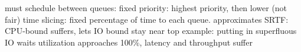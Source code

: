 \documentclass[12pt]{article}
\begin{document}
\begin{spacing}{0.6}
\begin{multicols*}{2}
\begin{flushleft}
\begin{outline}[longenum]
    \2 must schedule between queues:
      \3 fixed priority: highest priority, then lower (not fair)
      \3 time slicing: fixed percentage of time to each queue.
    \2 approximates SRTF: CPU-bound suffers, lets IO bound stay near top
    \2 example: putting in superfluous IO waits 
  \1utilization approaches 100\%, latency and throughput suffer





\end{outline}
\end{flushleft}
\end{multicols*}
\end{spacing}
\end{document}

